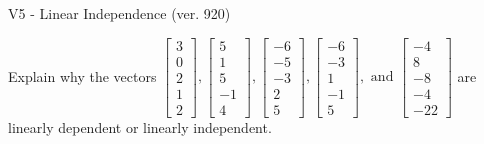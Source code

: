 \begin{exercise}
  \begin{exerciseTitle}V5 - Linear Independence (ver. 920)\end{exerciseTitle}
  \begin{exerciseStatement}
    Explain why the vectors \(\left[\begin{array}{r}
3 \\
0 \\
2 \\
1 \\
2
\end{array}\right] , \left[\begin{array}{r}
5 \\
1 \\
5 \\
-1 \\
4
\end{array}\right] , \left[\begin{array}{r}
-6 \\
-5 \\
-3 \\
2 \\
5
\end{array}\right] , \left[\begin{array}{r}
-6 \\
-3 \\
1 \\
-1 \\
5
\end{array}\right] , \text{ and } \left[\begin{array}{r}
-4 \\
8 \\
-8 \\
-4 \\
-22
\end{array}\right]\) are linearly dependent or linearly independent.	



\end{exerciseStatement}
\end{exercise}
